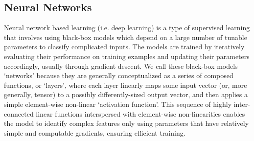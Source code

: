 \subsection{Neural Networks}
Neural network based learning (i.e. deep learning) is a type of supervised learning that involves using black-box models which depend on a large number of tunable parameters to classify complicated inputs.
The models are trained by iteratively evaluating their performance on training examples and updating their parameters accordingly, usually through gradient descent.
We call these black-box models `networks' because they are generally conceptualized as a series of composed functions, or `layers', where each layer linearly maps some input vector (or, more generally, tensor) to a possibly differently-sized output vector, and then applies a simple element-wise non-linear `activation function'.
This sequence of highly inter-connected linear functions interspersed with element-wise non-linearities enables the model to identify complex features only using parameters that have relatively simple and computable gradients, ensuring efficient training.


